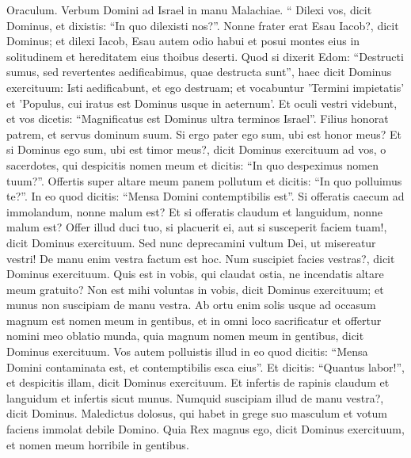\begin{biblechapter}
 \verse Oraculum. Verbum Domini ad Israel in manu Malachiae.
 \verse “ Dilexi vos, dicit Dominus, et dixistis: “In quo dilexisti nos?”. Nonne frater erat Esau Iacob?, dicit Dominus; et dilexi Iacob, 
\verse Esau autem odio habui et posui montes eius in solitudinem et hereditatem eius thoibus deserti. 
 \verse Quod si dixerit Edom: “Destructi sumus, sed revertentes aedificabimus, quae destructa sunt”, haec dicit Dominus exercituum: Isti aedificabunt, et ego destruam; et vocabuntur 'Termini impietatis' et 'Populus, cui iratus est Dominus usque in aeternum'. 
\verse Et oculi vestri videbunt, et vos dicetis: “Magnificatus est Dominus ultra terminos Israel”.
 \verse Filius honorat patrem, et servus dominum suum. Si ergo pater ego sum, ubi est honor meus? Et si Dominus ego sum, ubi est timor meus?, dicit Dominus exercituum ad vos, o sacerdotes, qui despicitis nomen meum et dicitis: “In quo despeximus nomen tuum?”. 
\verse Offertis super altare meum panem pollutum et dicitis: “In quo polluimus te?”. In eo quod dicitis: “Mensa Domini contemptibilis est”. 
\verse Si offeratis caecum ad immolandum, nonne malum est? Et si offeratis claudum et languidum, nonne malum est? Offer illud duci tuo, si placuerit ei, aut si susceperit faciem tuam!, dicit Dominus exercituum. 
\verse Sed nunc deprecamini vultum Dei, ut misereatur vestri! De manu enim vestra factum est hoc. Num suscipiet facies vestras?, dicit Dominus exercituum. 
\verse Quis est in vobis, qui claudat ostia, ne incendatis altare meum gratuito? Non est mihi voluntas in vobis, dicit Dominus exercituum; et munus non suscipiam de manu vestra. 
\verse Ab ortu enim solis usque ad occasum magnum est nomen meum in gentibus, et in omni loco sacrificatur et offertur nomini meo oblatio munda, quia magnum nomen meum in gentibus, dicit Dominus exercituum. 
\verse Vos autem polluistis illud in eo quod dicitis: “Mensa Domini contaminata est, et contemptibilis esca eius”. 
\verse Et dicitis: “Quantus labor!”, et despicitis illam, dicit Dominus exercituum. Et infertis de rapinis claudum et languidum et infertis sicut munus. Numquid suscipiam illud de manu vestra?, dicit Dominus. 
 \verse Maledictus dolosus, qui habet in grege suo masculum et votum faciens immolat debile Domino. Quia Rex magnus ego, dicit Dominus exercituum, et nomen meum horribile in gentibus.
 

\end{biblechapter}
